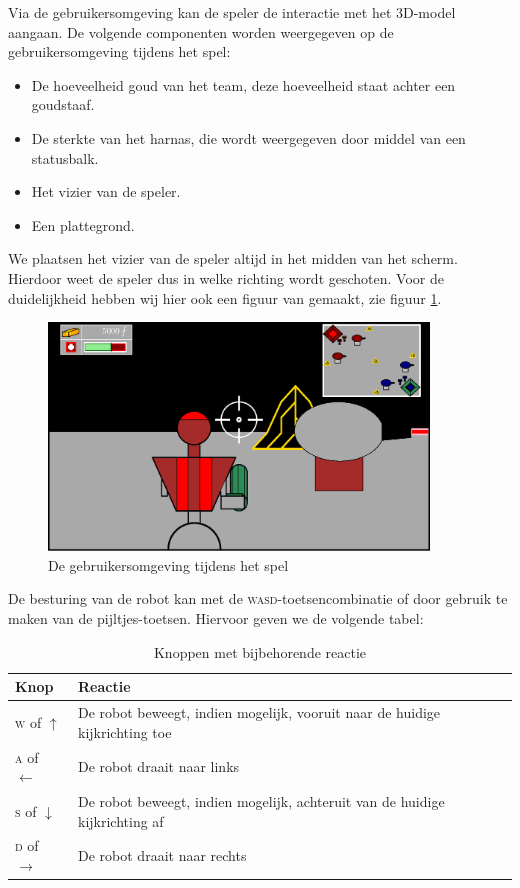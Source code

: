     Via de gebruikersomgeving kan de speler de interactie met het 3D-model aangaan. De volgende componenten worden weergegeven op de gebruikersomgeving tijdens het spel:
    \begin{itemize}
    \item De hoeveelheid goud van het team, deze hoeveelheid staat achter een goudstaaf.
    \item De sterkte van het harnas, die wordt weergegeven door middel van een statusbalk.
    \item Het vizier van de speler.
    \item Een plattegrond.
    \end{itemize}

    We plaatsen het vizier van de speler altijd in het midden van het scherm. Hierdoor weet de speler dus in welke richting wordt geschoten. Voor de duidelijkheid hebben wij hier ook een figuur van gemaakt, zie figuur \ref{fig:UI}.
    \begin{figure}[H]
    \includegraphics[width=0.9\textwidth]{../Graphics/UI.eps}
    \caption{De gebruikersomgeving tijdens het spel}
    \label{fig:UI}
    \end{figure}
    De besturing van de robot kan met de \textsc{wasd}-toetsencombinatie of door gebruik te maken van de pijltjes-toetsen. Hiervoor geven we de volgende tabel:
    \begin{table}[H]
        \small
        \centering
        \begin{tabular}{| l | l |}
        \hline
        Knop & Reactie \\ \hline
        \textsc{w} of $\uparrow$ & De robot beweegt, indien mogelijk, vooruit naar de huidige kijkrichting toe \\ \hline
        \textsc{a} of $\leftarrow$ & De robot draait naar links \\ \hline
        \textsc{s} of $\downarrow$ & De robot beweegt, indien mogelijk, achteruit van de huidige kijkrichting af \\ \hline
        \textsc{d} of $\rightarrow$ & De robot draait naar rechts \\ \hline
        \end{tabular}
        \caption{Knoppen met bijbehorende reactie}
        \label{tab:planning}
    \end{table}

